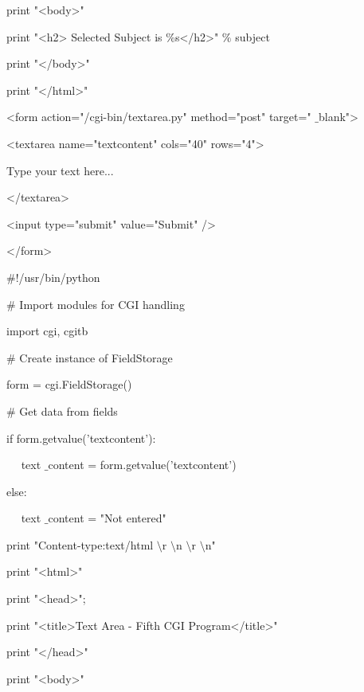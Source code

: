 \begin {enumerate}
\noindent 
print "<body>" \par
\noindent 
print "<h2> Selected Subject is  $  \%  $s</h2>"  $  \%  $ subject \par
\noindent 
print "</body>" \par
\noindent 
print "</html>" \par
\vspace{12pt}
\noindent 
<form action="/cgi-bin/textarea.py" method="post" target=" $  \_  $blank"> \par
\noindent 
<textarea name="textcontent" cols="40" rows="4"> \par
\noindent 
Type your text here... \par
\noindent 
</textarea> \par
\noindent 
<input type="submit" value="Submit" /> \par
\noindent 
</form> \par
\vspace{12pt}
\noindent 
 $  \#  $!/usr/bin/python \par
\vspace{12pt}
\noindent 
 $  \#  $ Import modules for CGI handling  \par
\noindent 
import cgi, cgitb  \par
\vspace{12pt}
\noindent 
 $  \#  $ Create instance of FieldStorage  \par
\noindent 
form = cgi.FieldStorage()  \par
\vspace{12pt}
\noindent 
 $  \#  $ Get data from fields \par
\noindent 
if form.getvalue('textcontent'): \par
\noindent 
~~ text $  \_  $content = form.getvalue('textcontent') \par
\noindent 
else: \par
\noindent 
~~ text $  \_  $content = "Not entered" \par
\vspace{12pt}
\noindent 
print "Content-type:text/html $  \setminus  $r $  \setminus  $n $  \setminus  $r $  \setminus  $n" \par
\noindent 
print "<html>" \par
\noindent 
print "<head>"; \par
\noindent 
print "<title>Text Area - Fifth CGI Program</title>" \par
\noindent 
print "</head>" \par
\noindent 
print "<body>" \par

\end{enumerate}
